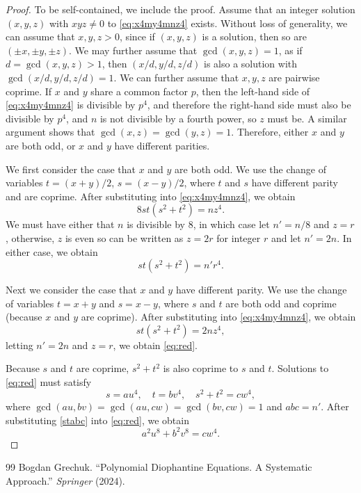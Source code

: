 \documentclass[10pt,a4paper]{amsart}
\begin{document}
\begin{proof} 
To be self-contained, we include the proof. Assume that an integer solution $(x,y,z)$ with $xyz \neq 0$ to \eqref{eq:x4my4mnz4} exists. Without loss of generality, we can assume that $x,y,z >0$, since if $(x,y,z)$ is a solution, then so are $(\pm x,\pm y, \pm z)$. We may further assume that $\gcd(x,y,z)=1$, as if $d=\gcd(x,y,z)>1$, then $(x/d,y/d,z/d)$ is also a solution with $\gcd(x/d,y/d,z/d)=1$.  We can further assume that $x,y,z$ are pairwise coprime. If $x$ and $y$ share a common factor $p$, then the left-hand side of \eqref{eq:x4my4mnz4} is divisible by $p^4$, and therefore the right-hand side must also be divisible by $p^4$, and $n$ is not divisible by a fourth power, so $z$ must be. A similar argument shows that $\gcd(x,z)=\gcd(y,z)=1$. 
Therefore, either $x$ and $y$ are both odd, or $x$ and $y$ have different parities. 

We first consider the case that $x$ and $y$ are both odd. We use the change of variables $t=(x+y)/2$, $s=(x-y)/2$, where $t$ and $s$ have different parity and are coprime. After substituting into \eqref{eq:x4my4mnz4}, we obtain
$$
8st(s^2+t^2)=nz^4.
$$
We must have either that $n$ is divisible by $8$, in which case let $n'=n/8$ and $z=r$, otherwise, $z$ is even so can be written as $z=2r$ for integer $r$ and let $n'=2n$. In either case, we obtain 
\begin{equation}\label{eq:red}
st(s^2+t^2)=n'r^4.
\end{equation}

Next we consider the case that $x$ and $y$ have different parity. We use the change of variables $t=x+y$ and $s=x-y$, where $s$ and $t$ are both odd and coprime (because $x$ and $y$ are coprime). After substituting into \eqref{eq:x4my4mnz4}, we obtain
$$
st(s^2+t^2)=2nz^4,
$$
letting $n'=2n$ and $z=r$, we obtain \eqref{eq:red}.

Because $s$ and $t$ are coprime, $s^2+t^2$ is also coprime to $s$ and $t$. Solutions to \eqref{eq:red} must satisfy
\begin{equation}\label{stabc}
s=au^4, \quad t=bv^4, \quad s^2+t^2=c w^4,
\end{equation}
where $\gcd(au,bv)=\gcd(au,cw)=\gcd(bv,cw)=1$ and $abc=n'$.
After substituting \eqref{stabc} into \eqref{eq:red}, we obtain 
$$
a^2u^8+b^2v^8=c w^4.
$$
\end{proof}

\begin{thebibliography}{99}
 Bogdan Grechuk. ``Polynomial Diophantine Equations. A Systematic Approach.'' \emph{Springer} (2024). %
\end{thebibliography}
\end{document}

